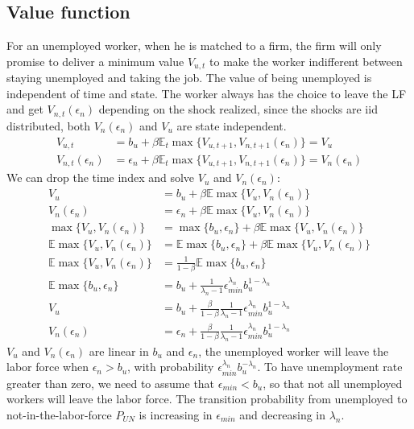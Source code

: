\documentclass[12pt]{article}
\newcommand{\E}{\mathbb{E}}
\newcommand{\1}{\mathbb{1}}
\begin{document}
\subsection{Value function}
For an unemployed worker, when he is matched to a firm, the firm will only promise to deliver a minimum value $V_{u,t}$ to make the worker indifferent between staying unemployed and taking the job. The value of being unemployed is independent of time and state. The worker always has the choice to leave the LF and get $V_{n,t}(\epsilon_n)$ depending on the shock realized, since the shocks are iid distributed, both $V_n(\epsilon_n)$ and $V_u$ are state independent. 
\begin{align*}
V_{u,t} &= b_u+\beta\E_t\max\{V_{u,t+1},V_{n,t+1}(\epsilon_n)\} = V_u \\
V_{n,t}(\epsilon_n) &= \epsilon_n+\beta\E_t\max\{V_{u,t+1},V_{n,t+1}(\epsilon_n)\} = V_{n}(\epsilon_n) 
\end{align*}
We can drop the time index and solve $V_u$ and $V_n(\epsilon_n)$: 
\begin{align*}
V_u &= b_u+\beta\E\max\{V_u,V_n(\epsilon_n)\} \\
V_n(\epsilon_n) &= \epsilon_n+\beta\E\max\{V_u,V_n(\epsilon_n)\}  \\
\max\{V_u,V_n(\epsilon_n)\} &= \max \{b_u,\epsilon_n\}+\beta\E\max\{V_u,V_n(\epsilon_n)\}  \\
\E\max\{V_u,V_n(\epsilon_n)\} &= \E\max \{b_u,\epsilon_n\}+\beta\E\max\{V_u,V_n(\epsilon_n)\}  \\
\E\max\{V_u,V_n(\epsilon_n)\} &= \frac{1}{1-\beta}\E\max \{b_u,\epsilon_n\}  \\
\E\max \{b_u,\epsilon_n\}  &= b_u+\frac{1}{\lambda_n-1}\epsilon_{min}^{\lambda_n}b_u^{1-\lambda_n} \\
V_u &= b_u+\frac{\beta}{1-\beta}\frac{1}{\lambda_n-1}\epsilon_{min}^{\lambda_n}b_u^{1-\lambda_n} \\
V_n(\epsilon_n) &= \epsilon_n+\frac{\beta}{1-\beta}\frac{1}{\lambda_n-1}\epsilon_{min}^{\lambda_n}b_u^{1-\lambda_n} 
\end{align*}
$V_u$ and $V_n(\epsilon_n)$ are linear in $b_u$ and $\epsilon_n$, the unemployed worker will leave the labor force when $\epsilon_n>b_u$, with probability $\epsilon_{min}^{\lambda_n}b_u^{-\lambda_n}$. To have unemployment rate greater than zero, we need to assume that $\epsilon_{min}<b_u$, so that not all unemployed workers will leave the labor force. The transition probability from unemployed to not-in-the-labor-force $P_{UN}$ is increasing in $\epsilon_{min}$ and decreasing in $\lambda_n$. \\
\end{document}
